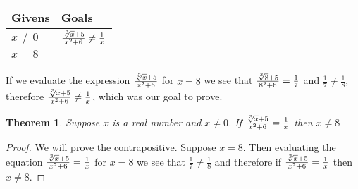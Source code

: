 \documentclass{article}
\newcommand{\n}{ \noindent }
\newtheorem*{theorem}{Theorem}  %
\begin{document}
\begin{table}[h]
\begin{tabular}{ll}
\hline
Givens & Goals  \\ \hline
$x \neq 0$ & $\tfrac{\sqrt[\leftroot{-1}\uproot{1}3]{x} + 5}{x^2 + 6} \neq \tfrac{1}{x}$ \\
$x = 8$ & \\ \hline
\end{tabular}
\end{table}

\n If we evaluate the expression $\tfrac{\sqrt[\leftroot{-1}\uproot{1}3]{x} + 5}{x^2 + 6}$ for $x = 8$ we see that $\tfrac{\sqrt[\leftroot{-1}\uproot{1}3]{8} + 5}{8^2 + 6} = \tfrac{1}{7}$ and $\tfrac{1}{7} \neq \tfrac{1}{8}$, therefore $\tfrac{\sqrt[\leftroot{-1}\uproot{1}3]{x} + 5}{x^2 + 6} \neq \tfrac{1}{x}$, which was our goal to prove.

\begin{theorem} Suppose $x$ is a real number and $x \neq 0$. If $\tfrac{\sqrt[\leftroot{-1}\uproot{1}3]{x} + 5}{x^2 + 6} = \tfrac{1}{x}$ then $x \neq 8$
\end{theorem}
\begin{proof}
We will prove the contrapositive. Suppose $x = 8$. Then evaluating the equation $\tfrac{\sqrt[\leftroot{-1}\uproot{1}3]{x} + 5}{x^2 + 6} = \tfrac{1}{x}$ for $x = 8$ we see that $\tfrac{1}{7} \neq \tfrac{1}{8}$ and therefore if $\tfrac{\sqrt[\leftroot{-1}\uproot{1}3]{x} + 5}{x^2 + 6} = \tfrac{1}{x}$ then $x \neq 8$.
\end{proof}
\end{document}
